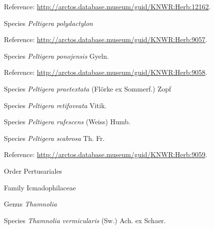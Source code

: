 \documentclass[9pt, article]{memoir}
\begin{document}
\begin{multicols}{2}
\vspace{6pt}Reference: 
\url{http://arctos.database.museum/guid/KNWR:Herb:12162}.

\vspace{6pt}\noindent\hspace{36pt}Species \textit{Peltigera polydactylon}


\vspace{6pt}Reference: 
\url{http://arctos.database.museum/guid/KNWR:Herb:9057}.

\vspace{6pt}\noindent\hspace{36pt}Species \textit{Peltigera ponojensis} Gyeln.


\vspace{6pt}Reference: 
\url{http://arctos.database.museum/guid/KNWR:Herb:9058}.

\vspace{6pt}\noindent\hspace{36pt}Species \textit{Peltigera praetextata} (Flörke ex Sommerf.) Zopf


\vspace{6pt}\noindent\hspace{36pt}Species \textit{Peltigera retifoveata} Vitik.


\vspace{6pt}\noindent\hspace{36pt}Species \textit{Peltigera rufescens} (Weiss) Humb.


\vspace{6pt}\noindent\hspace{36pt}Species \textit{Peltigera scabrosa} Th. Fr.


\vspace{6pt}Reference: 
\url{http://arctos.database.museum/guid/KNWR:Herb:9059}.

\vspace{6pt}\noindent\hspace{18pt}Order Pertusariales


\vspace{6pt}\noindent\hspace{24pt}Family Icmadophilaceae


\vspace{6pt}\noindent\hspace{30pt}Genus \textit{Thamnolia}


\vspace{6pt}\noindent\hspace{36pt}Species \textit{Thamnolia vermicularis} (Sw.) Ach. ex Schaer.



\end{multicols}
\end{document}
